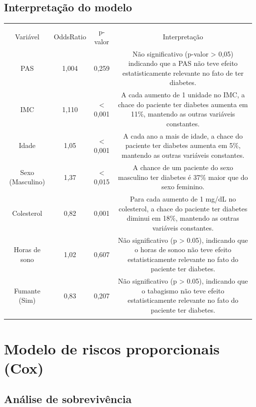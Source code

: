 \documentclass[
  letterpaper,
  DIV=11,
  numbers=noendperiod]{scrartcl}
\begin{document}
\subsection{Interpretação do
modelo}\label{interpretauxe7uxe3o-do-modelo-1}

\begin{longtable}[]{@{}cccc@{}}
\toprule\noalign{}
& & & \\
Variável & OddsRatio & p-valor & Interpretação \\
\midrule\noalign{}
\endhead
\bottomrule\noalign{}
\endlastfoot
PAS & 1,004 & 0,259 & Não significativo (p-valor \textgreater{} 0,05)
indicando que a PAS não teve efeito estatisticamente relevante no fato
de ter diabetes. \\
IMC & 1,110 & \textless{} 0,001 & A cada aumento de 1 unidade no IMC, a
chace do paciente ter diabetes aumenta em 11\%, mantendo as outras
variáveis constantes. \\
Idade & 1,05 & \textless{} 0,001 & A cada ano a mais de idade, a chace
do paciente ter diabetes aumenta em 5\%, mantendo as outras variáveis
constantes. \\
Sexo (Masculino) & 1,37 & \textless{} 0,015 & A chance de um paciente do
sexo masculino ter diabetes é 37\% maior que do sexo feminino. \\
Colesterol & 0,82 & 0,001 & Para cada aumento de 1 mg/dL no colesterol,
a chace do paciente ter diabetes diminui em 18\%, mantendo as outras
variáveis constantes. \\
Horas de sono & 1,02 & 0,607 & Não significativo (p \textgreater{}
0.05), indicando que o horas de sonoo não teve efeito estatisticamente
relevante no fato do paciente ter diabetes. \\
Fumante (Sim) & 0,83 & 0,207 & Não significativo (p \textgreater{}
0.05), indicando que o tabagismo não teve efeito estatisticamente
relevante no fato do paciente ter diabetes. \\
& & & \\
\end{longtable}

\section{Modelo de riscos proporcionais
(Cox)}\label{modelo-de-riscos-proporcionais-cox}

\subsection{Análise de
sobrevivência}\label{anuxe1lise-de-sobrevivuxeancia}
\end{document}
